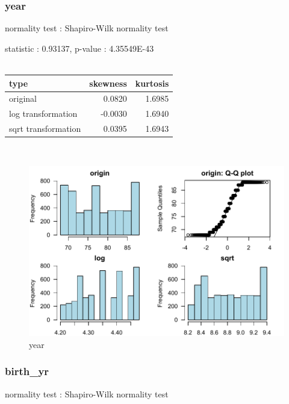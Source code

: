 \documentclass{book}\usepackage[]{graphicx}\usepackage[]{color}
\begin{document}
\subsubsection{ year }

normality test : Shapiro-Wilk normality test

\noindent statistic : 0.93137,  p-value : 4.35549E-43\\
\\%
\begin{tabular}{lrr}
  \toprule
type & skewness & kurtosis \\ 
  \midrule
original & 0.0820 & 1.6985 \\ 
  log transformation & -0.0030 & 1.6940 \\ 
  sqrt transformation & 0.0395 & 1.6943 \\ 
   \bottomrule
\end{tabular}
\\
\begin{figure}[!ht]
\centering
\includegraphics[width=1.0\textwidth]{figure/norm2.pdf}
\caption{year}
\end{figure}
\clearpage
\subsubsection{ birth\_yr }

normality test : Shapiro-Wilk normality test
\end{document}
